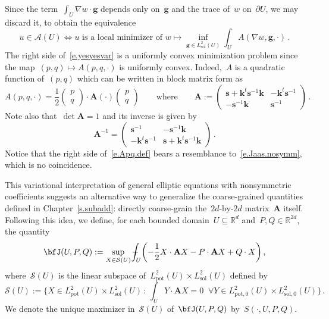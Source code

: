 \documentclass[11pt,twoside]{article} %
\numberwithin{equation}{section}
\theoremstyle{definition}
\newcommand*{\R}{\ensuremath{\mathbb{R}}}
\newcommand*{\Rd}{\ensuremath{\mathbb{R}^d}}
\newcommand{\g}{\mathbf{g}}
\newcommand{\s}{\mathbf{s}}
\renewcommand{\k}{\mathbf{k}}
\renewcommand{\S}{\mathcal{S}}
\def\Xint#1{\mathchoice
{\XXint\displaystyle\textstyle{#1}}%
{\XXint\textstyle\scriptstyle{#1}}%
{\XXint\scriptstyle\scriptscriptstyle{#1}}%
{\XXint\scriptscriptstyle\scriptscriptstyle{#1}}%
\!\int}
\def\XXint#1#2#3{{\setbox0=\hbox{$#1{#2#3}{\int}$}
\vcenter{\hbox{$#2#3$}}\kern-.5\wd0}}
\def\fint{\Xint-}
\newcommand{\A}{\mathcal{A}}
\newcommand{\Lsol}{L^2_{\mathrm{sol}}}
\newcommand{\Lsolo}{L^2_{\mathrm{sol,0}}}
\newcommand{\Lpot}{L^2_{\mathrm{pot}}}
\newcommand{\Lpoto}{L^2_{\mathrm{pot,0}}}
\newcommand{\bfA}{\mathbf{A}}
\begin{document}
\smallskip

Since the term~$\int_U \nabla w\cdot \g$ depends only on~$\g$ and the trace of~$w$ on~$\partial U$, we may discard it, to obtain the equivalence 
\begin{equation}
\label{e.yesyesvar}
u\in \A(U) 
\iff
\text{$u$ is a local minimizer of }
w\mapsto \inf_{\g \in \Lsol(U)}
\int_U 
A(\nabla w,\g,\cdot)
\,.
\end{equation}
The right side of~\eqref{e.yesyesvar} is a uniformly convex minimization problem since the map~$(p,q) \mapsto A(p,q,\cdot)$ is uniformly convex. Indeed,~$A$  is a quadratic function of~$(p,q)$ which can be written in block matrix form as
\begin{equation}
\label{e.bfA.form}
A(p,q,\cdot) 
=
\frac12 \begin{pmatrix} p \\ q \end{pmatrix}
\cdot
\bfA(\cdot)
\begin{pmatrix} p \\ q \end{pmatrix}
\qquad \mbox{where} \qquad
\bfA := 
\begin{pmatrix} \s + \k^t\s^{-1}\k & -\k^t\s^{-1} \\ - \s^{-1}\k & \s^{-1} \end{pmatrix}
\,.
\end{equation}
Note also that~$\det \bfA = 1$ and its inverse is given by
\begin{equation}
\label{e.bfA.form.inv}
\bfA^{-1} = 
\begin{pmatrix} 
 \s^{-1}& - \s^{-1}\k  \\ - \k^t\s^{-1}&\s + \k^t\s^{-1}\k  \end{pmatrix}
 \,.
\end{equation}
Notice that the right side of~\eqref{e.Apq.def} bears a resemblance to~\eqref{e.Jaas.nosymm}, which is no coincidence.

\smallskip

This variational interpretation of general elliptic equations with nonsymmetric coefficients suggests an alternative way to generalize the coarse-grained quantities defined in Chapter~\ref{s.subadd}: directly coarse-grain the~$2d$-by-$2d$ matrix~$\bfA$ itself. Following this idea, we define, for each bounded domain~$U\subseteq\Rd$ and~$P ,Q \in \R^{2d}$, the quantity 
\begin{equation}
\label{e.bfJ.var}
\bfJ(U, P,Q )
:=
\sup_{X  \in \S(U)}
\fint_U
\biggl( -\frac12  X  \cdot \bfA X -  P \cdot \bfA X +Q\cdot X \biggr)
\,,
\end{equation}
where~$\S(U)$ is the linear subspace of~$\Lpot(U) \times \Lsol(U)$
defined by
\begin{equation}
\label{e.bfS}
\S(U) :=
\biggl\{
X \in \Lpot(U) \times \Lsol(U) \,:\, 
\int_U Y \cdot \bfA X=0
\; \;  \forall Y \in \Lpoto(U) \times \Lsolo(U)
\biggr\}
\,.
\end{equation}
We denote the unique maximizer in~$\S(U)$ of~$\bfJ(U,P,Q)$ by~$S(\cdot,U,P,Q)$. 
\end{document}

